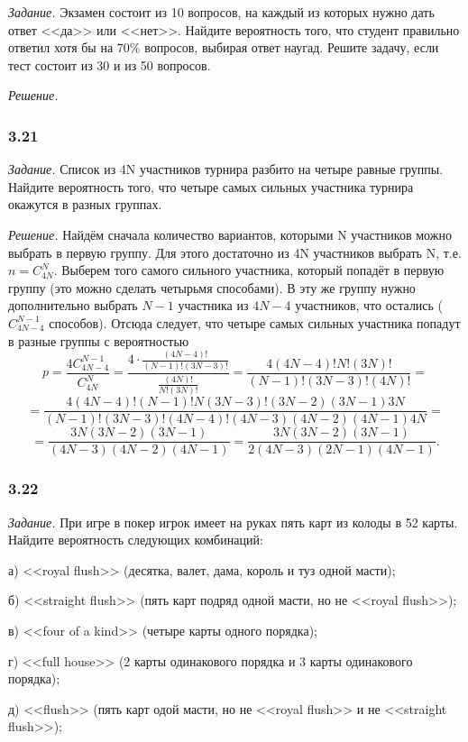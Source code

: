 \documentclass{book}
\begin{document}
\textit{Задание.} Экзамен состоит из 10 вопросов, на каждый из которых нужно дать ответ <<да>> или <<нет>>. Найдите вероятность того, что студент правильно ответил хотя бы на $70\%$ вопросов, выбирая ответ наугад. Решите задачу, если тест состоит из 30 и из 50 вопросов.

\textit{Решение.}

\subsubsection*{3.21}

\textit{Задание.} Список из 4N участников турнира разбито на четыре равные группы. Найдите вероятность того, что четыре самых сильных участника турнира окажутся в разных группах. 

\textit{Решение.} Найдём сначала количество вариантов, которыми N участников можно выбрать в первую группу. Для этого достаточно из 4N участников выбрать N, т.е. $n=C_{4N}^N$. Выберем того самого сильного участника, который попадёт в первую группу (это можно сделать четырьмя способами). В эту же группу нужно дополнительно выбрать $N-1$ участника из $4N-4$ участников, что остались ($C_{4N-4}^{N-1}$ способов). Отсюда следует, что четыре самых сильных участника попадут в разные группы с вероятностью $$p=\frac{4C_{4N-4}^{N-1}}{C_{4N}^N}=\frac{4\cdot\frac{(4N-4)!}{(N-1)!(3N-3)!}}{\frac{(4N)!}{N!(3N)!}}=\frac{4(4N-4)!N!(3N)!}{(N-1)!(3N-3)!(4N)!}=$$$$=\frac{4(4N-4)!(N-1)!N(3N-3)!(3N-2)(3N-1)3N}{(N-1)!(3N-3)!(4N-4)!(4N-3)(4N-2)(4N-1)4N}=$$$$=\frac{3N(3N-2)(3N-1)}{(4N-3)(4N-2)(4N-1)}=\frac{3N(3N-2)(3N-1)}{2(4N-3)(2N-1)(4N-1)}.$$

\subsubsection*{3.22}

\textit{Задание.} При игре в покер игрок имеет на руках пять карт из колоды в 52 карты. Найдите вероятность следующих комбинаций:

а) <<royal flush>> (десятка, валет, дама, король и туз одной масти);

б) <<straight flush>> (пять карт подряд одной масти, но не <<royal flush>>);

в) <<four of a kind>> (четыре карты одного порядка);

г) <<full house>> (2 карты одинакового порядка и 3 карты одинакового порядка);

д) <<flush>> (пять карт одой масти, но не <<royal flush>> и не <<straight flush>>);
\end{document}
